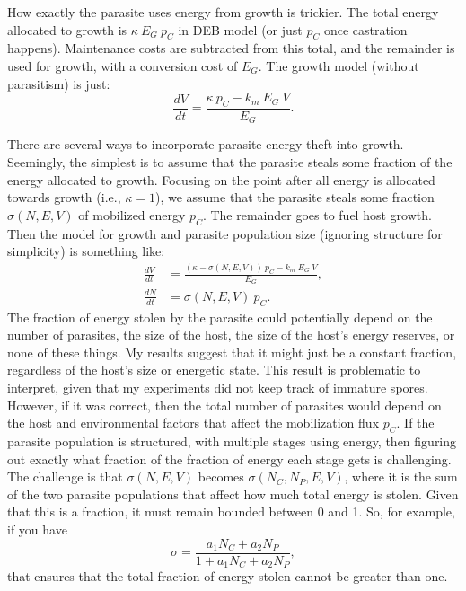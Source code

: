 \documentclass[12pt,reqno,final,pdftex]{amsart}\usepackage[]{graphicx}\usepackage[]{color}
\theoremstyle{plain}
\numberwithin{equation}{part}
\begin{document}
How exactly the parasite uses energy from growth is trickier.
The total energy allocated to growth is $\kappa~E_G~p_C$ in DEB model (or just $p_C$ once castration happens).
Maintenance costs are subtracted from this total, and the remainder is used for growth, with a conversion cost of $E_G$.
The growth model (without parasitism) is just:
\begin{equation}
\frac{dV}{dt} = \frac{\kappa~p_C - k_m~E_G~V}{E_G}.
\end{equation}

There are several ways to incorporate parasite energy theft into growth.
Seemingly, the simplest is to assume that the parasite steals some fraction of the energy allocated to growth.
Focusing on the point after all energy is allocated towards growth (i.e., $\kappa=1$), we assume that the parasite steals some fraction $\sigma(N,E,V)$ of mobilized energy $p_C$. The remainder goes to fuel host growth. Then the model for growth and parasite population size (ignoring structure for simplicity) is something like:
\begin{align}
\frac{dV}{dt} &= \frac{(\kappa-\sigma(N,E,V))~p_C - k_m~E_G~V}{E_G}, \\
\frac{dN}{dt} &= \sigma(N,E,V)~p_C.
\end{align}
The fraction of energy stolen by the parasite could potentially depend on the number of parasites, the size of the host, the size of the host's energy reserves, or none of these things.
My results suggest that it might just be a constant fraction, regardless of the host's size or energetic state.
This result is problematic to interpret, given that my experiments did not keep track of immature spores.
However, if it was correct, then the total number of parasites would depend on the host and environmental factors that affect the mobilization flux $p_C$.
If the parasite population is structured, with multiple stages using energy, then figuring out exactly what fraction of the fraction of energy each stage gets is challenging.
The challenge is that $\sigma(N,E,V)$ becomes $\sigma(N_C, N_P, E, V)$, where it is the sum of the two parasite populations that affect how much total energy is stolen.
Given that this is a fraction, it must remain bounded between 0 and 1.
So, for example, if you have
\begin{equation}
\sigma = \frac{a_1 N_C + a_2 N_P}{1 + a_1 N_C + a_2 N_P},
\end{equation}
that ensures that the total fraction of energy stolen cannot be greater than one.
\end{document}
